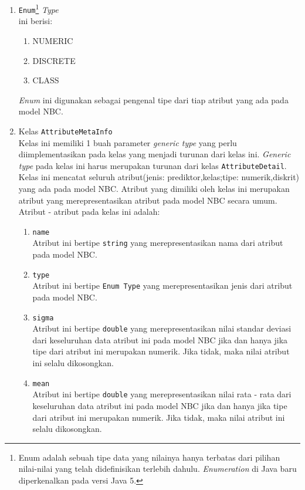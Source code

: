 \begin{enumerate}
	\item \texttt{Enum}\footnote{Enum adalah sebuah tipe data yang nilainya hanya terbatas dari pilihan nilai-nilai yang telah didefinisikan terlebih dahulu. \textit{Enumeration} di Java baru diperkenalkan pada versi Java 5.} \textit{Type}\\ ini berisi:
	\begin{enumerate}
		\item NUMERIC
		\item DISCRETE
		\item CLASS
	\end{enumerate}
	\textit{Enum} ini digunakan sebagai pengenal tipe dari tiap atribut yang ada pada model NBC.
	
	\item{Kelas \texttt{AttributeMetaInfo}}\\
	Kelas ini memiliki 1 buah parameter \textit{generic type} yang perlu diimplementasikan pada kelas yang menjadi turunan dari kelas ini. \textit{Generic type} pada kelas ini harus merupakan turunan dari kelas \texttt{AttributeDetail}. Kelas ini mencatat seluruh atribut(jenis: prediktor,kelas;tipe: numerik,diskrit) yang ada pada model NBC. Atribut yang dimiliki oleh kelas ini merupakan atribut yang merepresentasikan atribut pada model NBC secara umum. Atribut - atribut pada kelas ini adalah:
	\begin{enumerate}
		\item{\texttt{name}}\\ 
		Atribut ini bertipe \texttt{string} yang merepresentasikan nama dari atribut pada model NBC.

		\item{\texttt{type}}\\
		Atribut ini bertipe \texttt{Enum Type} yang merepresentasikan jenis dari atribut pada model NBC.

		\item{\texttt{sigma}}\\
		Atribut ini bertipe \texttt{double} yang merepresentasikan nilai standar deviasi dari keseluruhan data atribut ini pada model NBC jika dan hanya jika tipe dari atribut ini merupakan numerik. Jika tidak, maka nilai atribut ini selalu dikosongkan.

		\item{\texttt{mean}}\\
		Atribut ini bertipe \texttt{double} yang merepresentasikan nilai rata - rata dari keseluruhan data atribut ini pada model NBC jika dan hanya jika tipe dari atribut ini merupakan numerik. Jika tidak, maka nilai atribut ini selalu dikosongkan.


\end{enumerate}
\end{enumerate}

